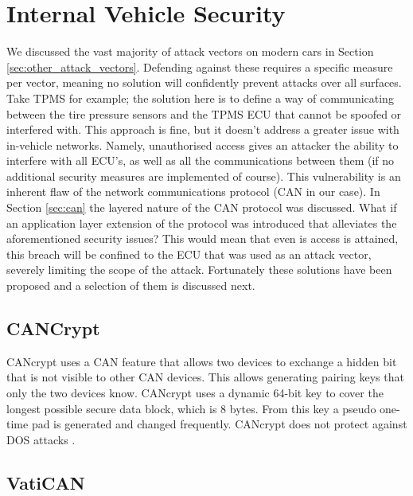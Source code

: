 \section{Internal Vehicle Security}
\label{sec:internal_vehicle_security}

We discussed the vast majority of attack vectors on modern cars in Section \ref{sec:other_attack_vectors}. Defending against these requires a specific measure per vector, meaning no solution will confidently prevent attacks over all surfaces. Take TPMS for example; the solution here is to define a way of communicating between the tire pressure sensors and the TPMS ECU that cannot be spoofed or interfered with. This approach is fine, but it doesn't address a greater issue with in-vehicle networks. Namely, unauthorised access gives an attacker the ability to interfere with all ECU's, as well as all the communications between them (if no additional security measures are implemented of course). This vulnerability is an inherent flaw of the network communications protocol (CAN in our case). In Section \ref{sec:can} the layered nature of the CAN protocol was discussed. What if an application layer extension of the protocol was introduced that alleviates the aforementioned security issues? This would mean that even is access is attained, this breach will be confined to the ECU that was used as an attack vector, severely limiting the scope of the attack. Fortunately these solutions have been proposed and a selection of them is discussed next.

\subsection{CANCrypt}
\label{subsec:cancrypt}

CANcrypt uses a CAN feature that allows two devices to exchange a hidden bit that is not visible to other CAN devices. This allows generating pairing keys that only the two devices know. CANcrypt uses a dynamic 64-bit key to cover the longest possible secure data block, which is 8 bytes. From this key a pseudo one-time pad is generated and changed frequently. CANcrypt does not protect against DOS attacks \cite{Pfeiffer}.

\subsection{VatiCAN} 
\label{subsec:vatican}

